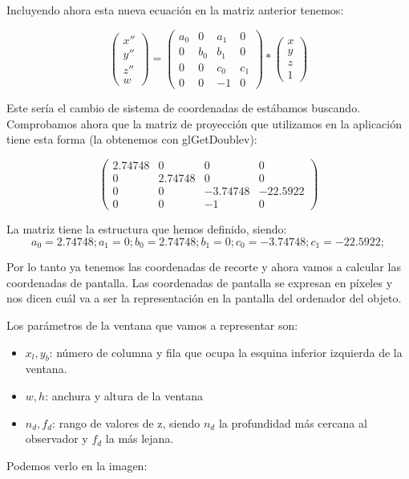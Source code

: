 \documentclass[a4paper,11pt, oneside]{book}
\begin{document}
Incluyendo ahora esta nueva ecuación en la matriz anterior tenemos:

$$\begin{pmatrix}
x''\\
y''\\
z'' \\
w
\end{pmatrix}=
\begin{pmatrix}
a_0 & 0&a_1&0\\
0&b_0&b_1&0\\
0&0&c_0&c_1\\
0&0&-1&0
\end{pmatrix}*
\begin{pmatrix}
x\\
y\\
z\\
1
\end{pmatrix}
$$

Este sería el cambio de sistema de coordenadas de estábamos buscando. Comprobamos ahora que la matriz de proyección que utilizamos en la aplicación tiene esta forma (la obtenemos con glGetDoublev):

$$\begin{pmatrix}
2.74748 & 0&0&0\\
0&2.74748 &0&0\\
0&0&-3.74748&-22.5922\\
0&0&-1&0
\end{pmatrix}$$

La matriz tiene la estructura que hemos definido, siendo:
$$a_0 = 2.74748;
a_1 = 0;
b_0 = 2.74748;
b_1 = 0;
c_0 = -3.74748;
c_1 = -22.5922;
$$

Por lo tanto ya tenemos las coordenadas de recorte y ahora vamos a calcular las coordenadas de pantalla. Las coordenadas de pantalla se expresan en píxeles y nos dicen cuál va a ser la representación en la pantalla del ordenador del objeto.

Los parámetros de la ventana que vamos a representar son:
\begin{itemize}
	\item $x_l, y_b$: número de columna y fila que ocupa la esquina inferior izquierda de la ventana.
	\item $w,h$: anchura y altura de la ventana
	\item $n_d, f_d$: rango de valores de z, siendo $n_d$ la profundidad más cercana al observador y $f_d$ la más lejana.
\end{itemize}
Podemos verlo en la imagen:
\end{document}
